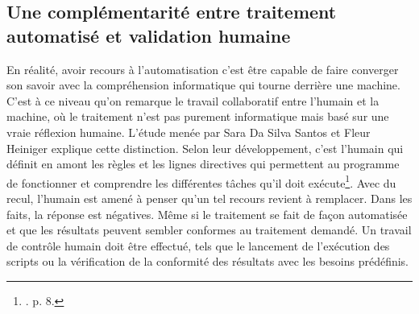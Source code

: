 \subsection*{Une complémentarité entre traitement automatisé et validation humaine}

En réalité, avoir recours à l'automatisation c'est être capable de faire converger son savoir avec la compréhension informatique qui tourne derrière une machine. C'est à ce niveau qu'on remarque le travail collaboratif entre l'humain et la machine, où le traitement n’est pas purement informatique mais basé sur une vraie réflexion humaine. 
L'étude menée par Sara Da Silva Santos et Fleur Heiniger explique cette distinction. Selon leur développement, c'est l'humain qui définit en amont les règles et les lignes directives qui permettent au programme de fonctionner et comprendre les différentes tâches qu'il doit exécute\footnote{\cite{da-silva-santos-heiniger-2024}. p. 8.}. Avec du recul, l'humain est amené à penser qu'un tel recours revient à remplacer. Dans les faits, la réponse est négatives. Même si le traitement se fait de façon automatisée et que les résultats peuvent sembler conformes au traitement demandé. Un travail de contrôle humain doit être effectué, tels que le lancement de l'exécution des scripts ou la vérification de la conformité des résultats avec les besoins prédéfinis. 




